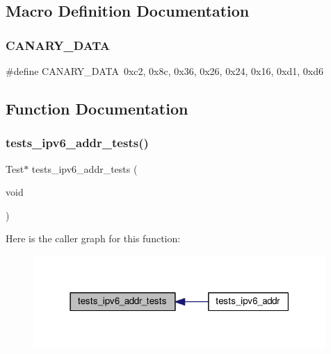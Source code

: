 \subsection{Macro Definition Documentation}
\mbox{\label{tests-ipv6__addr_8c_ade0f6d6db5f2a80e8d0e63b60cc8b208}} 
\subsubsection{\texorpdfstring{C\+A\+N\+A\+R\+Y\+\_\+\+D\+A\+TA}{CANARY\_DATA}}
{\footnotesize\ttfamily \#define C\+A\+N\+A\+R\+Y\+\_\+\+D\+A\+TA~0xc2, 0x8c, 0x36, 0x26, 0x24, 0x16, 0xd1, 0xd6}



\subsection{Function Documentation}
\mbox{\label{tests-ipv6__addr_8c_ae297f88d584b1bdc12b64b01bcc3d665}} 
\subsubsection{\texorpdfstring{tests\+\_\+ipv6\+\_\+addr\+\_\+tests()}{tests\_ipv6\_addr\_tests()}}
{\footnotesize\ttfamily Test$\ast$ tests\+\_\+ipv6\+\_\+addr\+\_\+tests (\begin{DoxyParamCaption}\item[{void}]{ }\end{DoxyParamCaption})}

Here is the caller graph for this function\+:
\nopagebreak
\begin{figure}[H]
\begin{center}
\leavevmode
\includegraphics[width=315pt]{tests-ipv6__addr_8c_ae297f88d584b1bdc12b64b01bcc3d665_icgraph}
\end{center}
\end{figure}
